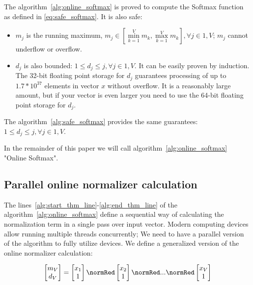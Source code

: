 The algorithm~\ref{alg:online_softmax} is proved to compute the Softmax function as defined in \eqref{eq:safe_softmax}. It is also safe:

\begin{itemize}
\item $m_j$ is the running maximum, $m_j \in \left[\min\limits_{k=1}^{V}{m_k},\max\limits_{k=1}^{V}{m_k}\right], \forall j\in 1,V$; $m_j$ cannot underflow or overflow.
\item $d_j$ is also bounded: $1 \leq d_j \leq j, \forall j\in 1,V$. It can be easily proven by induction. The 32-bit floating point storage for $d_j$ guarantees processing of up to $1.7*10^{37}$ elements in vector $x$ without overflow. It is a reasonably large amount, but if your vector is even larger you need to use the 64-bit floating point storage for $d_j$.
\end{itemize}

The algorithm~\ref{alg:safe_softmax} provides the same guarantees: $1 \leq d_j \leq j, \forall j\in 1,V$. 

In the remainder of this paper we will call algorithm~\ref{alg:online_softmax} "Online Softmax".

\subsection{Parallel online normalizer calculation}

The lines~\ref{alg:start_thm_line}-\ref{alg:end_thm_line} of the algorithm~\ref{alg:online_softmax} define a sequential way of calculating the normalization term in a single pass over input vector. Modern computing devices allow running multiple threads concurrently; We need to have a parallel version of the algorithm to fully utilize devices. We define a generalized version of the online normalizer calculation:

\begin{equation}
\label{eq:generalized_online}
\begin{bmatrix}m_V\\d_V\end{bmatrix} = \begin{bmatrix}x_1\\1\end{bmatrix}\normRed\begin{bmatrix}x_2\\1\end{bmatrix}\normRed ...\normRed\begin{bmatrix}x_V\\1\end{bmatrix}
\end{equation}

